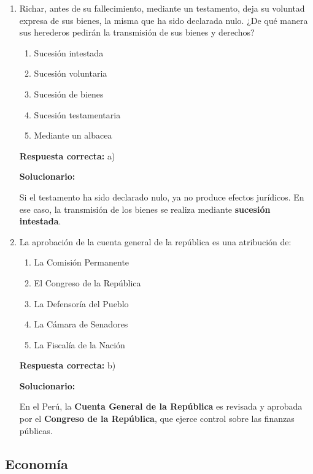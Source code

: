 \begin{enumerate}[resume]
	\item Richar, antes de su fallecimiento, mediante un testamento, deja su voluntad expresa de sus bienes, la misma que ha sido declarada nulo. ¿De qué manera sus herederos pedirán la transmisión de sus bienes y derechos?
	\begin{enumerate}[label=\alph*)]
		\item Sucesión intestada
		\item Sucesión voluntaria
		\item Sucesión de bienes
		\item Sucesión testamentaria
		\item Mediante un albacea
	\end{enumerate}
	\textbf{Respuesta correcta:} a)
	
	\vspace{2mm}
	\textbf{Solucionario:}
	
	Si el testamento ha sido declarado nulo, ya no produce efectos jurídicos. En ese caso, la transmisión de los bienes se realiza mediante \textbf{sucesión intestada}.
	
	\vspace{6mm}
	
	\item La aprobación de la cuenta general de la república es una atribución de:
	\begin{enumerate}[label=\alph*)]
		\item La Comisión Permanente
		\item El Congreso de la República
		\item La Defensoría del Pueblo
		\item La Cámara de Senadores
		\item La Fiscalía de la Nación
	\end{enumerate}
	\textbf{Respuesta correcta:} b)
	
	\vspace{2mm}
	\textbf{Solucionario:}
	
	En el Perú, la \textbf{Cuenta General de la República} es revisada y aprobada por el \textbf{Congreso de la República}, que ejerce control sobre las finanzas públicas.
	
	\vspace{6mm}
	
\end{enumerate}

\subsection*{Economía}

